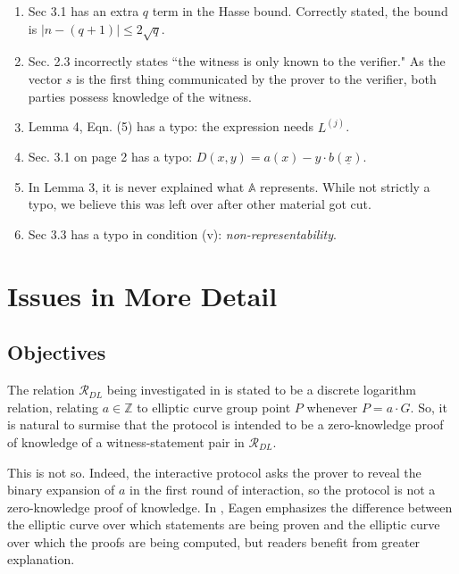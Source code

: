 \documentclass{article}
\theoremstyle{definition}
\newcommand{\6}{\mathbf}
\newcommand{\7}{\mathcal}
\begin{document}
\begin{enumerate}
    \item Sec 3.1 has an extra $q$ term in the Hasse bound. Correctly stated, the bound is $|n-(q+1)| \leq 2\sqrt{q}$.

    \item Sec. 2.3 incorrectly states ``the witness is only known to the verifier." As the vector $s$ is the first thing communicated by the prover to the verifier, both parties possess knowledge of the witness.

    \item Lemma 4, Eqn. (5) has a typo: the expression needs $L^{(j)}$.

    \item Sec. 3.1 on page 2 has a typo: $D(x,y) = a(x) - y \cdot b(\underline{x})$.

    \item In Lemma 3, it is never explained what $\mathds{A}$ represents. While not strictly a typo, we believe this was left over after other material got cut.

    \item Sec 3.3 has a typo in condition (v): \textit{non-representability}.
\end{enumerate}




\section{Issues in More Detail}

\subsection{Objectives}\label{sec:explainbetter}

The relation $\mathcal{R}_{DL}$ being investigated in \cite{BassaSoundnessIPDL} is stated to be a discrete logarithm relation, relating $a \in \mathbb{Z}$ to elliptic curve group point $P$ whenever $P = a  \cdot G$. 
So, it is natural to surmise that the protocol is intended to be a zero-knowledge proof of knowledge of a witness-statement pair in $\mathcal{R}_{DL}$. 
\smallskip

This is not so. Indeed, the interactive protocol asks the prover to reveal the binary expansion of $a$ in the first round of interaction, so the protocol is not a zero-knowledge proof of knowledge. In \cite{Eagen22}, Eagen emphasizes the difference between the elliptic curve over which statements are being proven and the elliptic curve over which the proofs are being computed, but readers benefit from greater explanation.
\smallskip
    
\end{document}
